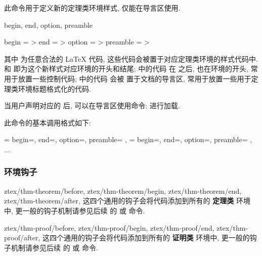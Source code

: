 \begin{function}[updated=2025-04-25]{\zthmstylenew}
  \begin{syntax}
  \end{syntax}
  此命令用于定义新的定理类环境样式, 仅能在导言区使用.
\end{function}


\begin{keyval}[parent=ztex/..]{begin, end, option, preamble}
  \begin{syntax}
    begin     = >
    end       = >
    option    = >
    preamble  = >
  \end{syntax}
  其中  为任意合法的 \LaTeX{} 代码, 这些代码会被置于对应定理类环境的样式代码中.
   和  即为这个新样式对应环境的开头和结尾;  中的代码
  在  之后, 也在环境的开头, 常用于放置一些控制代码;  中的代码
  会被 \ztex{} 置于文档的导言区, 常用于放置一些用于定理类环境标题格式化的代码.\par
  当用户声明对应的  后, 可以在导言区使用命令: \cmd{\zthmstyle}\texttt{} 进行加载.
\end{keyval}
此命令的基本调用格式如下:
\begin{DocExample}[++]
\zthmstylenew
  {
     =
      {
        begin=, 
        end=, 
        option=,
        preamble=
      },
     =
      {
        begin=, 
        end=, 
        option=,
        preamble=
      },
    ...
  }
\end{DocExample}


\clearpage
\subsubsection{环境钩子}
\begin{function}[added=2025-05-05]{
    ztex/thm-theorem/before,
    ztex/thm-theorem/begin,
    ztex/thm-theorem/end,
    ztex/thm-theorem/after,
  }
  这四个通用的钩子会将代码添加到所有的 \textbf{定理类} 环境中, 更一般的钩子机制请参见后续
  的 \cmd{\zthmhook} 或 \cmd{\zthmproofhook} 命令.
\end{function}


\begin{function}[added=2025-05-05]{
    ztex/thm-proof/before,
    ztex/thm-proof/begin,
    ztex/thm-proof/end,
    ztex/thm-proof/after,
  }
  这四个通用的钩子会将代码添加到所有的 \textbf{证明类} 环境中, 更一般的钩子机制请参见后续
  的 \cmd{\zthmhook} 或 \cmd{\zthmproofhook} 命令.
\end{function}


